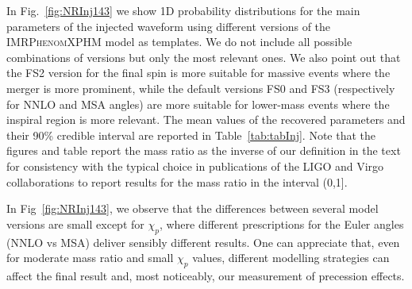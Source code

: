 \documentclass[%
aps,
prd,
amssymb,
amsmath,
amsfonts,
eqsecnum,
showpacs,
nofootinbib,
floatfix,
twocolumn,
twoside,
a4paper,
superscriptaddress
]{revtex4-1}
\newcommand{\phXPHM}{\textsc{IMRPhenomXPHM}\xspace}
\begin{document}
In Fig.~\ref{fig:NRInj143}
we show 1D probability distributions for the main parameters of the injected waveform using different versions of the \phXPHM model as templates. We do not include all possible combinations of versions but only the most relevant ones. We also point out that the FS2 version for the final spin is more suitable for massive events where the merger is more prominent, while the default versions FS0 and FS3 (respectively for NNLO and MSA angles) are more suitable for lower-mass events where the inspiral region is more relevant. The mean values of the recovered parameters and their 90\% credible interval are reported in Table~\ref{tab:tabInj}. Note that the figures and table report the mass ratio as the inverse of our definition in the text for consistency with the typical choice in publications of the LIGO and Virgo collaborations to report results for the mass ratio in the interval (0,1].

In Fig~\ref{fig:NRInj143}, %
we observe that the differences between several model versions are small except for $\chi_p$, where different prescriptions for the Euler angles (NNLO vs MSA) deliver sensibly different results. One can appreciate that, even for moderate mass ratio and small $\chi_p$ values, different modelling strategies can affect the final result and, most noticeably, our measurement of precession effects.

\end{document}
